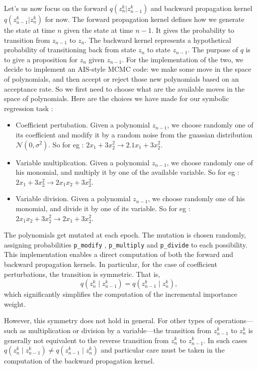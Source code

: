 \documentclass[11pt,a4paper]{article}
\begin{document}
		Let's us now focus on the forward $q(z_n^k | z_{n-1}^k)$ and backward propagation kernel $q(z_{n-1}^k | z_n^k)$ for now. The forward propagation kernel defines how we generate the state at time $n$ given the state at time $n-1$. It gives the probability to transition from $z_{n-1}$ to $z_n$. The backward kernel represents a hypothetical probability of transitioning back from state $z_n$ to state $z_{n-1}$. The purpose of $q$ is to give a proposition for $z_n$ given $z_{n-1}$. For the implementation of the two, we decide to implement an AIS-style MCMC code: we make some move in the space of polynomials, and then accept or reject those new polynomials based on an acceptance rate. So we first need to choose what are the available moves in the space of polynomials. Here are the choices we have made for our symbolic regression task : 
		\begin{itemize}
			\item Coefficient pertubation. Given a polynomial $z_{n-1}$, we choose randomly one of its coefficient and modify it by a random noise from the guassian distribution $\mathcal{N}(0,\sigma^2)$. So for eg : $2 x_1 + 3 x_2^2 \rightarrow  2.1 x_1 + 3 x_2^2$.
			\item Variable multiplication. Given a polynomial $z_{n-1}$, we choose randomly one of his monomial, and multiply it by one of the available variable. So for eg : $2 x_1 + 3 x_2^2 \rightarrow  2 x_1 x_2 + 3 x_2^2$.
			\item Variable division. Given a polynomial $z_{n-1}$, we choose randomly one of his monomial, and divide it by one of its variable. So for eg : $2 x_1 x_2 + 3 x_2^2 \rightarrow  2 x_1 + 3 x_2^2$. 
		\end{itemize}
		The polynomials get mutated at each epoch. The mutation is chosen randomly, assigning probabilities \texttt{p\_{modify}} , \texttt{p\_{multiply}} and \texttt{p\_{divide}} to each possibility. This implementation enables a direct computation of both the forward and backward propagation kernels. In particular, for the case of coefficient perturbations, the transition is symmetric. That is,
		\begin{equation}
			q(z_n^k \mid z_{n-1}^k) = q(z_{n-1}^k \mid z_n^k),
		\end{equation}
		which significantly simplifies the computation of the incremental importance weight.
		
		However, this symmetry does not hold in general. For other types of operations—such as multiplication or division by a variable—the transition from \( z_{n-1}^k \) to \( z_n^k \) is generally not equivalent to the reverse transition from \( z_n^k \) to \( z_{n-1}^k \). In such cases $q(z_n^k \mid z_{n-1}^k) \ne q(z_{n-1}^k \mid z_n^k)$ and particular care must be taken in the computation of the backward propagation kernel.
		
\end{document}
